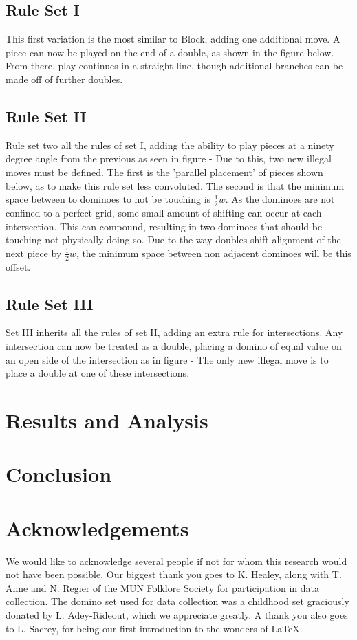 \documentclass{article}
\begin{document}
\subsection{Rule Set I}
This first variation is the most similar to Block, adding one additional move. A piece can now be played on the end of a double, as shown in the figure below. %
From there, play continues in a straight line, though additional branches can be made off of further doubles.
\subsection{Rule Set II}
Rule set two all the rules of set I, adding the ability to play pieces at a ninety degree angle from the previous as seen in figure - %
Due to this, two new illegal moves must be defined. The first is the 'parallel placement' of pieces shown below, as to make this rule set less convoluted. The second is that the minimum space between to dominoes to not be touching is \(\frac{1}{2}w\). As the dominoes are not confined to a perfect grid, some small amount of shifting can occur at each intersection. This can compound, resulting in two dominoes that should be touching not physically doing so. Due to the way doubles shift alignment of the next piece by \(\frac{1}{2}w\), the minimum space between non adjacent dominoes will be this offset.
\subsection{Rule Set III}
Set III inherits all the rules of set II, adding an extra rule for intersections. Any intersection can now be treated as a double, placing a domino of equal value on an open side of the intersection as in figure - %
The only new illegal move is to place a double at one of these intersections.

\section{Results and Analysis}
\section{Conclusion}

\section*{Acknowledgements}
We would like to acknowledge several people if not for whom this research would not have been possible. Our biggest thank you goes to K. Healey, along with T. Anne and N. Regier of the MUN Folklore Society for participation in data collection. The domino set used for data collection was a childhood set graciously donated by L. Adey-Rideout, which we appreciate greatly. A thank you also goes to L. Sacrey, for being our first introduction to the wonders of \LaTeX.



\end{document}

